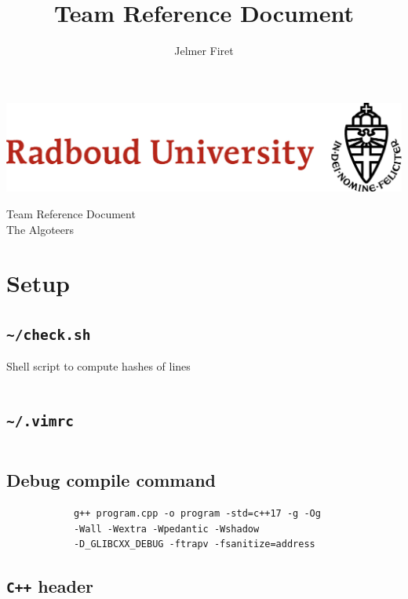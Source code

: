 \documentclass[11pt, a4paper]{amsart}
\title{Team Reference Document}
\author{Jelmer Firet}
\begin{document}
	\begin{center}
		\begin{minipage}[c]{0.45\textwidth}
			\includegraphics[width=\textwidth]{resouce/radboud_logo_full.jpg}
		\end{minipage}\;
		\begin{minipage}[c]{0.35\textwidth}
			\LARGE Team Reference Document\\
			\Large The Algoteers
		\end{minipage}
	\end{center}
	\begin{multicols}{2}
		\tableofcontents
		\columnbreak
		\vfill\null
	\end{multicols}
	\section{Setup} %
	\begin{multicols}{2}
		\subsection{\texttt{\textasciitilde/check.sh}}
		Shell script to compute hashes of lines
		\inputminted[lastline=3]{sh}{.code/setup/check.sh}
		\subsection{\texttt{\textasciitilde/.vimrc}}
		\inputminted[lastline=9]{sh}{.code/setup/vimrc.sh}
		\subsection{Debug compile command}
		\begin{verbatim}
			g++ program.cpp -o program -std=c++17 -g -Og
			-Wall -Wextra -Wpedantic -Wshadow
			-D_GLIBCXX_DEBUG -ftrapv -fsanitize=address
		\end{verbatim}
		\columnbreak
		\subsection{\texttt{C++} header}
		\inputminted[firstline=2,lastline=17]{cpp}{.code/setup/header.cpp}
	\end{multicols}
	\newpage
	\setcounter{page}{2}
\end{document}
